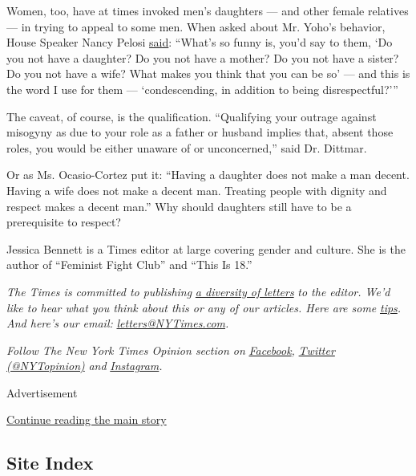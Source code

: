 Women, too, have at times invoked men's daughters --- and other female
relatives --- in trying to appeal to some men. When asked about Mr.
Yoho's behavior, House Speaker Nancy Pelosi
\href{https://www.independent.co.uk/news/world/americas/us-politics/aoc-speech-today-nancy-pelosi-ted-yoho-congress-floor-a9635191.html}{said}:
``What's so funny is, you'd say to them, `Do you not have a daughter? Do
you not have a mother? Do you not have a sister? Do you not have a wife?
What makes you think that you can be so' --- and this is the word I use
for them --- `condescending, in addition to being disrespectful?'''

The caveat, of course, is the qualification. ``Qualifying your outrage
against misogyny as due to your role as a father or husband implies
that, absent those roles, you would be either unaware of or
unconcerned,'' said Dr. Dittmar.

Or as Ms. Ocasio-Cortez put it: ``Having a daughter does not make a man
decent. Having a wife does not make a decent man. Treating people with
dignity and respect makes a decent man.'' Why should daughters still
have to be a prerequisite to respect?

Jessica Bennett is a Times editor at large covering gender and culture.
She is the author of ``Feminist Fight Club'' and ``This Is 18.''

\emph{The Times is committed to publishing}
\href{https://www.nytimes3xbfgragh.onion/2019/01/31/opinion/letters/letters-to-editor-new-york-times-women.html}{\emph{a
diversity of letters}} \emph{to the editor. We'd like to hear what you
think about this or any of our articles. Here are some}
\href{https://help.nytimes3xbfgragh.onion/hc/en-us/articles/115014925288-How-to-submit-a-letter-to-the-editor}{\emph{tips}}\emph{.
And here's our email:}
\href{mailto:letters@NYTimes.com}{\emph{letters@NYTimes.com}}\emph{.}

\emph{Follow The New York Times Opinion section on}
\href{https://www.facebookcorewwwi.onion/nytopinion}{\emph{Facebook}}\emph{,}
\href{http://twitter.com/NYTOpinion}{\emph{Twitter (@NYTopinion)}}
\emph{and}
\href{https://www.instagram.com/nytopinion/}{\emph{Instagram}}\emph{.}

Advertisement

\protect\hyperlink{after-bottom}{Continue reading the main story}

\hypertarget{site-index}{%
\subsection{Site Index}\label{site-index}}

